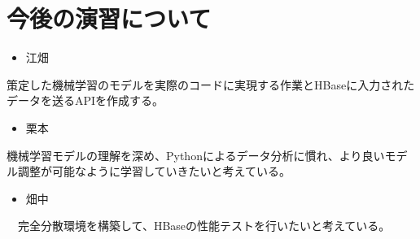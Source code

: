 \documentclass{scrartcl}
\begin{document}
\section{今後の演習について}
\label{sec:orgf289936}
\begin{itemize}
\item 江畑\\
\end{itemize}
策定した機械学習のモデルを実際のコードに実現する作業とHBaseに入力されたデータを送るAPIを作成する。\\
\begin{itemize}
\item 栗本\\
\end{itemize}
機械学習モデルの理解を深め、Pythonによるデータ分析に慣れ、より良いモデル調整が可能なように学習していきたいと考えている。\\
\begin{itemize}
\item 畑中\\
\end{itemize}
　完全分散環境を構築して、HBaseの性能テストを行いたいと考えている。\\
\end{document}
